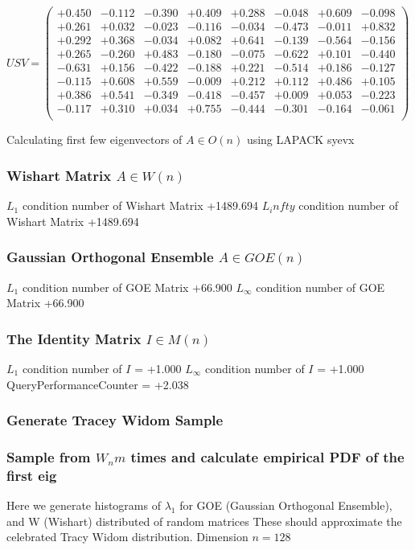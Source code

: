 \documentclass[9pt]{article}
\theoremstyle{plain}
\theoremstyle{definition}
\theoremstyle{remark}
\numberwithin{equation}{section}
\begin{document}
$U S V = \left(
\begin{array}{
cccccccc}
+0.450 & -0.112 & -0.390 & +0.409 & +0.288 & -0.048 & +0.609 & -0.098 \\
+0.261 & +0.032 & -0.023 & -0.116 & -0.034 & -0.473 & -0.011 & +0.832 \\
+0.292 & +0.368 & -0.034 & +0.082 & +0.641 & -0.139 & -0.564 & -0.156 \\
+0.265 & -0.260 & +0.483 & -0.180 & -0.075 & -0.622 & +0.101 & -0.440 \\
-0.631 & +0.156 & -0.422 & -0.188 & +0.221 & -0.514 & +0.186 & -0.127 \\
-0.115 & +0.608 & +0.559 & -0.009 & +0.212 & +0.112 & +0.486 & +0.105 \\
+0.386 & +0.541 & -0.349 & -0.418 & -0.457 & +0.009 & +0.053 & -0.223 \\
-0.117 & +0.310 & +0.034 & +0.755 & -0.444 & -0.301 & -0.164 & -0.061 \\
\end{array}
\right)$ \newline 

Calculating first few eigenvectors of $A \in O(n)$ using LAPACK syevx

\subsubsection{Wishart Matrix $A \in W(n)$}
$L_1$ condition number of Wishart Matrix +1489.694
$L_infty$ condition number of Wishart Matrix +1489.694
\subsubsection{Gaussian Orthogonal Ensemble $A \in GOE(n)$}
$L_1$ condition number of GOE Matrix +66.900
$L_\infty$ condition number of GOE Matrix +66.900
\subsubsection{The Identity Matrix $I \in M(n)$}
$L_1$ condition number of $I$ = +1.000
$L_\infty$ condition number of $I$ = +1.000
QueryPerformanceCounter  =  +2.038
\subsubsection{Generate Tracey Widom Sample}
\subsubsection{Sample from $W_n m$ times and calculate empirical PDF of the first eig}
Here we generate histograms of $\lambda_1$ for GOE (Gaussian Orthogonal Ensemble), and W (Wishart) 		 distributed of random matrices
These should approximate the celebrated Tracy Widom distribution.
Dimension $n = 128$
\end{document}
